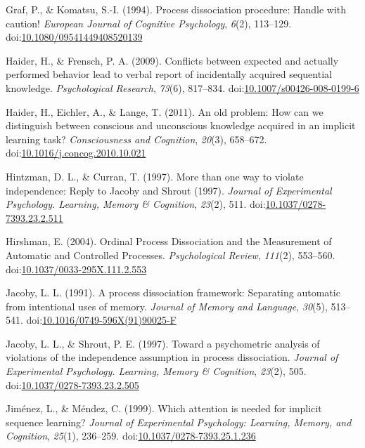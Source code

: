 \documentclass[jou]{apa6}
\theoremstyle{definition}
\theoremstyle{definition}
\theoremstyle{definition}
\theoremstyle{remark}
\begin{document}
\hypertarget{ref-graf_process_1994}{}
Graf, P., \& Komatsu, S.-I. (1994). Process dissociation procedure:
Handle with caution! \emph{European Journal of Cognitive Psychology},
\emph{6}(2), 113--129.
doi:\href{https://doi.org/10.1080/09541449408520139}{10.1080/09541449408520139}

\hypertarget{ref-haider_conflicts_2009}{}
Haider, H., \& Frensch, P. A. (2009). Conflicts between expected and
actually performed behavior lead to verbal report of incidentally
acquired sequential knowledge. \emph{Psychological Research},
\emph{73}(6), 817--834.
doi:\href{https://doi.org/10.1007/s00426-008-0199-6}{10.1007/s00426-008-0199-6}

\hypertarget{ref-haider_old_2011}{}
Haider, H., Eichler, A., \& Lange, T. (2011). An old problem: How can we
distinguish between conscious and unconscious knowledge acquired in an
implicit learning task? \emph{Consciousness and Cognition},
\emph{20}(3), 658--672.
doi:\href{https://doi.org/10.1016/j.concog.2010.10.021}{10.1016/j.concog.2010.10.021}

\hypertarget{ref-hintzman_more_1997}{}
Hintzman, D. L., \& Curran, T. (1997). More than one way to violate
independence: Reply to Jacoby and Shrout (1997). \emph{Journal of
Experimental Psychology. Learning, Memory \& Cognition}, \emph{23}(2),
511.
doi:\href{https://doi.org/10.1037/0278-7393.23.2.511}{10.1037/0278-7393.23.2.511}

\hypertarget{ref-hirshman_ordinal_2004}{}
Hirshman, E. (2004). Ordinal Process Dissociation and the Measurement of
Automatic and Controlled Processes. \emph{Psychological Review},
\emph{111}(2), 553--560.
doi:\href{https://doi.org/10.1037/0033-295X.111.2.553}{10.1037/0033-295X.111.2.553}

\hypertarget{ref-jacoby_process_1991}{}
Jacoby, L. L. (1991). A process dissociation framework: Separating
automatic from intentional uses of memory. \emph{Journal of Memory and
Language}, \emph{30}(5), 513--541.
doi:\href{https://doi.org/10.1016/0749-596X(91)90025-F}{10.1016/0749-596X(91)90025-F}

\hypertarget{ref-jacoby_toward_1997}{}
Jacoby, L. L., \& Shrout, P. E. (1997). Toward a psychometric analysis
of violations of the independence assumption in process dissociation.
\emph{Journal of Experimental Psychology. Learning, Memory \&
Cognition}, \emph{23}(2), 505.
doi:\href{https://doi.org/10.1037/0278-7393.23.2.505}{10.1037/0278-7393.23.2.505}

\hypertarget{ref-jimenez_which_1999}{}
Jiménez, L., \& Méndez, C. (1999). Which attention is needed for
implicit sequence learning? \emph{Journal of Experimental Psychology:
Learning, Memory, and Cognition}, \emph{25}(1), 236--259.
doi:\href{https://doi.org/10.1037/0278-7393.25.1.236}{10.1037/0278-7393.25.1.236}
\end{document}
